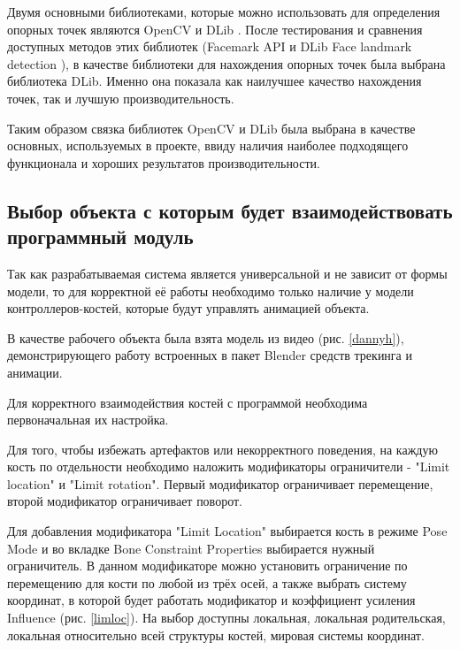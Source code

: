 Двумя основными библиотеками, которые можно использовать для определения опорных точек являются OpenCV и DLib \cite{dlibsite}. После тестирования и сравнения доступных методов этих библиотек (Facemark API \cite{facemark} и DLib Face landmark detection \cite{dlibfaceland}), в качестве библиотеки для нахождения опорных точек была выбрана библиотека DLib. Именно она показала как наилучшее качество нахождения точек, так и лучшую производительность.

Таким образом связка библиотек OpenCV и DLib была выбрана в качестве основных, используемых в проекте, ввиду наличия наиболее подходящего функционала и хороших результатов производительности.

\subsection{Выбор объекта с которым будет взаимодействовать программный модуль}


Так как разрабатываемая система является универсальной и не зависит от формы модели, то для корректной её работы необходимо только наличие у модели контроллеров-костей, которые будут управлять анимацией объекта.

В качестве рабочего объекта была взята модель из видео \cite{redditguy} (рис. \ref{dannyh}), демонстрирующего работу встроенных в пакет Blender средств трекинга и анимации.


Для корректного взаимодействия костей с программой необходима первоначальная их настройка.

Для того, чтобы избежать артефактов или некорректного поведения, на каждую кость по отдельности необходимо наложить модификаторы ограничители - "Limit location" и "Limit rotation". Первый модификатор ограничивает перемещение, второй модификатор ограничивает поворот.

Для добавления модификатора "Limit Location" выбирается кость в режиме Pose Mode и во вкладке Bone Constraint Properties выбирается нужный ограничитель. В данном модификаторе можно установить ограничение по перемещению для кости по любой из трёх осей, а также выбрать систему координат, в которой будет работать модификатор и коэффициент усиления Influence (рис. \ref{limloc}). На выбор доступны локальная, локальная родительская, локальная относительно всей структуры костей, мировая системы координат.


